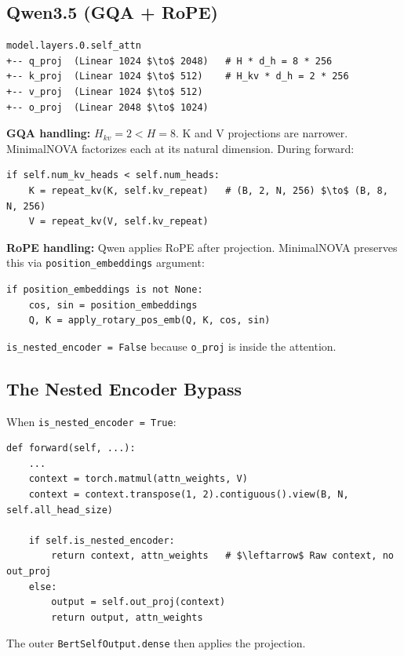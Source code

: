 \subsection{Qwen3.5 (GQA + RoPE)}

\begin{lstlisting}
model.layers.0.self_attn
+-- q_proj  (Linear 1024 $\to$ 2048)   # H * d_h = 8 * 256
+-- k_proj  (Linear 1024 $\to$ 512)    # H_kv * d_h = 2 * 256
+-- v_proj  (Linear 1024 $\to$ 512)
+-- o_proj  (Linear 2048 $\to$ 1024)
\end{lstlisting}

\textbf{GQA handling:} $H_{kv} = 2 < H = 8$. K and V projections are narrower. 
MinimalNOVA factorizes each at its natural dimension. During forward:

\begin{lstlisting}
if self.num_kv_heads < self.num_heads:
    K = repeat_kv(K, self.kv_repeat)   # (B, 2, N, 256) $\to$ (B, 8, N, 256)
    V = repeat_kv(V, self.kv_repeat)
\end{lstlisting}

\textbf{RoPE handling:} Qwen applies RoPE after projection. MinimalNOVA preserves 
this via \texttt{position\_embeddings} argument:

\begin{lstlisting}
if position_embeddings is not None:
    cos, sin = position_embeddings
    Q, K = apply_rotary_pos_emb(Q, K, cos, sin)
\end{lstlisting}

\texttt{is\_nested\_encoder = False} because \texttt{o\_proj} is inside the attention.

\subsection{The Nested Encoder Bypass}

When \texttt{is\_nested\_encoder = True}:

\begin{lstlisting}
def forward(self, ...):
    ...
    context = torch.matmul(attn_weights, V)
    context = context.transpose(1, 2).contiguous().view(B, N, self.all_head_size)
    
    if self.is_nested_encoder:
        return context, attn_weights   # $\leftarrow$ Raw context, no out_proj
    else:
        output = self.out_proj(context)
        return output, attn_weights
\end{lstlisting}

The outer \texttt{BertSelfOutput.dense} then applies the projection.

